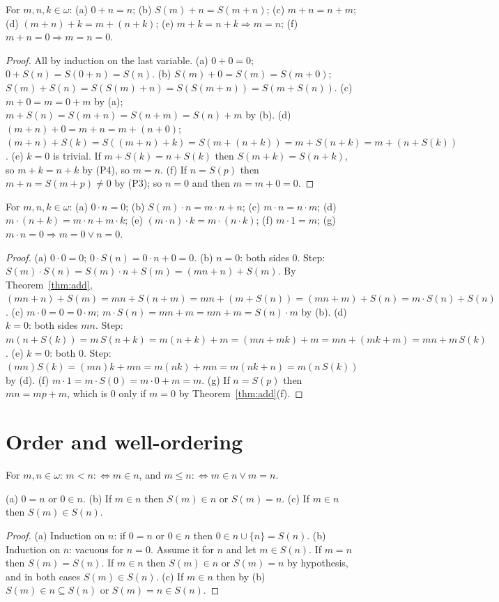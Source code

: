 \begin{theorem}\label{thm:add}
	For $m,n,k\in\omega$: (a) $0+n=n$; (b) $S(m)+n=S(m+n)$; (c) $m+n=n+m$; (d) $(m+n)+k=m+(n+k)$; (e) $m+k=n+k\Rightarrow m=n$; (f) $m+n=0\Rightarrow m=n=0$.
\end{theorem}
\begin{proof}
	All by induction on the last variable.
	(a) $0+0=0$; $0+S(n)=S(0+n)=S(n)$. (b) $S(m)+0=S(m)=S(m+0)$; $S(m)+S(n)=S(S(m)+n)=S(S(m+n))=S(m+S(n))$.
	(c) $m+0=m=0+m$ by (a); $m+S(n)=S(m+n)=S(n+m)=S(n)+m$ by (b).
	(d) $(m+n)+0=m+n=m+(n+0)$; $(m+n)+S(k)=S((m+n)+k)=S(m+(n+k))=m+S(n+k)=m+(n+S(k))$.
	(e) $k=0$ is trivial. If $m+S(k)=n+S(k)$ then $S(m+k)=S(n+k)$, so $m+k=n+k$ by (P4), so $m=n$.
	(f) If $n=S(p)$ then $m+n=S(m+p)\neq0$ by (P3); so $n=0$ and then $m=m+0=0$.
\end{proof}

\begin{theorem}\label{thm:mult}
	For $m,n,k\in\omega$: (a) $0\cdot n=0$; (b) $S(m)\cdot n=m\cdot n+n$; (c) $m\cdot n=n\cdot m$; (d) $m\cdot(n+k)=m\cdot n+m\cdot k$; (e) $(m\cdot n)\cdot k=m\cdot(n\cdot k)$; (f) $m\cdot1=m$; (g) $m\cdot n=0\Rightarrow m=0\vee n=0$.
\end{theorem}
\begin{proof}
	(a) $0\cdot0=0$; $0\cdot S(n)=0\cdot n+0=0$. (b) $n=0$: both sides $0$. Step: $S(m)\cdot S(n)=S(m)\cdot n+S(m)=(mn+n)+S(m)$. By Theorem~\ref{thm:add}, $(mn+n)+S(m)=mn+S(n+m)=mn+(m+S(n))=(mn+m)+S(n)=m\cdot S(n)+S(n)$. (c) $m\cdot0=0=0\cdot m$; $m\cdot S(n)=mn+m=nm+m=S(n)\cdot m$ by (b). (d) $k=0$: both sides $mn$. Step: $m(n+S(k))=m\,S(n+k)=m(n+k)+m=(mn+mk)+m=mn+(mk+m)=mn+m\,S(k)$. (e) $k=0$: both $0$. Step: $(mn)S(k)=(mn)k+mn=m(nk)+mn=m(nk+n)=m(n\,S(k))$ by (d). (f) $m\cdot1=m\cdot S(0)=m\cdot0+m=m$. (g) If $n=S(p)$ then $mn=mp+m$, which is $0$ only if $m=0$ by Theorem~\ref{thm:add}(f).
\end{proof}

\section{Order and well-ordering}

\begin{definition}
	For $m,n\in\omega$: $m<n:\iff m\in n$, and $m\le n:\iff m\in n\vee m=n$.
\end{definition}

\begin{lemma}\label{lem:order}
	(a) $0=n$ or $0\in n$. (b) If $m\in n$ then $S(m)\in n$ or $S(m)=n$. (c) If $m\in n$ then $S(m)\in S(n)$.
\end{lemma}
\begin{proof}
	(a) Induction on $n$: if $0=n$ or $0\in n$ then $0\in n\cup\{n\}=S(n)$. (b) Induction on $n$: vacuous for $n=0$. Assume it for $n$ and let $m\in S(n)$. If $m=n$ then $S(m)=S(n)$. If $m\in n$ then $S(m)\in n$ or $S(m)=n$ by hypothesis, and in both cases $S(m)\in S(n)$. (c) If $m\in n$ then by (b) $S(m)\in n\subseteq S(n)$ or $S(m)=n\in S(n)$.
\end{proof}


